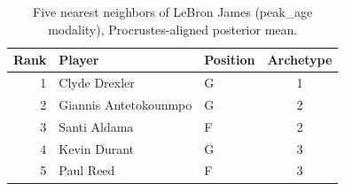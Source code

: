 \begin{table}[htbp]
  \centering\small
  \begin{tabular}{rllc}
    \toprule
    Rank & Player & Position & Archetype \\
    \midrule
    1 & Clyde Drexler & G & 1 \\
    2 & Giannis Antetokounmpo & G & 2 \\
    3 & Santi Aldama & F & 2 \\
    4 & Kevin Durant & G & 3 \\
    5 & Paul Reed & F & 3 \\
    \bottomrule
  \end{tabular}
  \caption{Five nearest neighbors of LeBron James (peak_age modality), Procrustes-aligned posterior mean.}
  \label{tab:LeBron_James_neighbors_peak_age}
\end{table}

